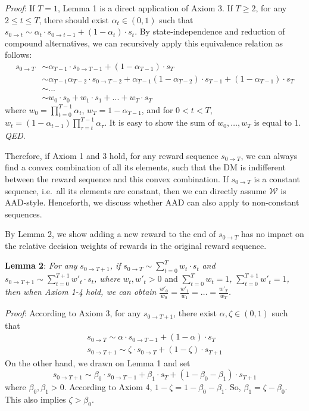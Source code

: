 \documentclass[
  12pt,
]{article}
\begin{document}
\noindent \emph{Proof}: If \(T=1\), Lemma 1 is a direct application of
Axiom 3. If \(T\geq 2\), for any \(2\leq t\leq T\), there should exist
\(\alpha_t\in(0,1)\) such that
\(s_{0\rightarrow t}\sim \alpha_t\cdot s_{0\rightarrow t-1}+(1-\alpha_t)\cdot s_{t}\).
By state-independence and reduction of compound alternatives, we can
recursively apply this equivalence relation as follows:\[
\begin{aligned}
s_{0\rightarrow T} &\sim \alpha_{T-1}\cdot s_{0\rightarrow T-1} + (1-\alpha_{T-1})\cdot s_T \\
&\sim  \alpha_{T-1}\alpha_{T-2}\cdot s_{0\rightarrow T-2} + \alpha_{T-1}(1-\alpha_{T-2})\cdot s_{T-1} + (1-\alpha_{T-1})\cdot s_T \\
& \sim ...\\
& \sim w_0 \cdot s_0 + w_1\cdot s_1 +... +w_T\cdot s_T
\end{aligned}
\]where \(w_0=\prod_{t=0}^{T-1}\alpha_t\), \(w_T = 1-\alpha_{T-1}\), and
for \(0<t<T\),
\(w_t=(1-\alpha_{t-1})\prod_{\tau=t}^{T-1}\alpha_{\tau}\). It is easy to
show the sum of \(w_0,…,w_T\) is equal to 1. \emph{QED}.

Therefore, if Axiom 1 and 3 hold, for any reward sequence
\(s_{0\rightarrow T}\), we can always find a convex combination of all
its elements, such that the DM is indifferent between the reward
sequence and this convex combination. If \(s_{0\rightarrow T}\) is a
constant sequence, i.e.~all its elements are constant, then we can
directly assume \(\mathcal{W}\) is AAD-style. Henceforth, we discuss
whether AAD can also apply to non-constant sequences.

By Lemma 2, we show adding a new reward to the end of
\(s_{0\rightarrow T}\) has no impact on the relative decision weights of
rewards in the original reward sequence.

\noindent \textbf{Lemma 2}: \emph{For any}
\(s_{0\rightarrow T+1}\)\emph{, if}
\(s_{0\rightarrow T}\sim \sum_{t=0}^T w_t \cdot s_t\) \emph{and}
\(s_{0\rightarrow T+1} \sim \sum_{t=0}^{T+1} w'_t\cdot s_t\)\emph{,
where} \(w_t, w'_t>0\) and \(\sum_{t=0}^Tw_t=1\)\emph{,}
\(\sum_{t=0}^{T+1}w'_t=1\)\emph{, then when Axiom 1-4 hold, we can
obtain} \(\frac{w'_0}{w_0}=\frac{w'_1}{w_1}=…=\frac{w'_T}{w_T}\)\emph{.}

\noindent \emph{Proof}: According to Axiom 3, for any
\(s_{0\rightarrow T+1}\), there exist \(\alpha,\zeta \in (0,1)\) such
that\[\tag{A1}
\begin{aligned}
s_{0 \rightarrow T}\sim\alpha\cdot s_{0 \rightarrow T-1} + (1-\alpha)\cdot s_T \\
s_{0\rightarrow T+1} \sim \zeta\cdot s_{0\rightarrow T} + (1-\zeta)\cdot s_{T+1}
\end{aligned}
\]On the other hand, we drawn on Lemma 1 and set\[\tag{A2}
s_{0\rightarrow T+1} \sim \beta_0\cdot s_{0 \rightarrow T-1} + \beta_1\cdot s_T + (1-\beta_0-\beta_1)\cdot s_{T+1}
\]where \(\beta_0, \beta_1 > 0\). According to Axiom 4,
\(1-\zeta=1-\beta_0-\beta_1\). So, \(\beta_1=\zeta-\beta_0\). This also
implies \(\zeta > \beta_0\).
\end{document}

